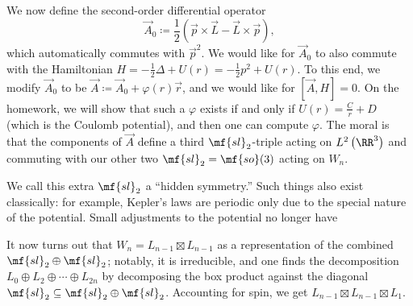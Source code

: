 \documentclass[../notes.tex]{subfiles}
\begin{document}
We now define the second-order differential operator
\[\vec A_0\coloneqq\frac12\left(\vec p\times\vec L-\vec L\times\vec p\right),\]
which automatically commutes with $\vec p^2$. We would like for $\vec A_0$ to also commute with the Hamiltonian $H=-\frac12\Delta+U(r)=-\frac12p^2+U(r)$. To this end, we modify $\vec A_0$ to be $\vec A\coloneqq\vec A_0+\varphi(r)\vec r$, and we would like for $[\vec A,H]=0$. On the homework, we will show that such a $\varphi$ exists if and only if $U(r)=\frac Cr+D$ (which is the Coulomb potential), and then one can compute $\varphi$. The moral is that the components of $\vec A$ define a third $\mf{sl}_2$-triple acting on $L^2\left(\RR^3\right)$ and commuting with our other two $\mf{sl}_2=\mf{so}(3)$ acting on $W_n$.
\begin{remark}
	We call this extra $\mf{sl}_2$ a ``hidden symmetry.'' Such things also exist classically: for example, Kepler's laws are periodic only due to the special nature of the potential. Small adjustments to the potential no longer have 
\end{remark}
It now turns out that $W_n=L_{n-1}\boxtimes L_{n-1}$ as a representation of the combined $\mf{sl}_2\oplus\mf{sl}_2$; notably, it is irreducible, and one finds the decomposition $L_0\oplus L_2\oplus\cdots\oplus L_{2n}$ by decomposing the box product against the diagonal $\mf{sl}_2\subseteq\mf{sl}_2\oplus\mf{sl}_2$. Accounting for spin, we get $L_{n-1}\boxtimes L_{n-1}\boxtimes L_1$.
\end{document}

